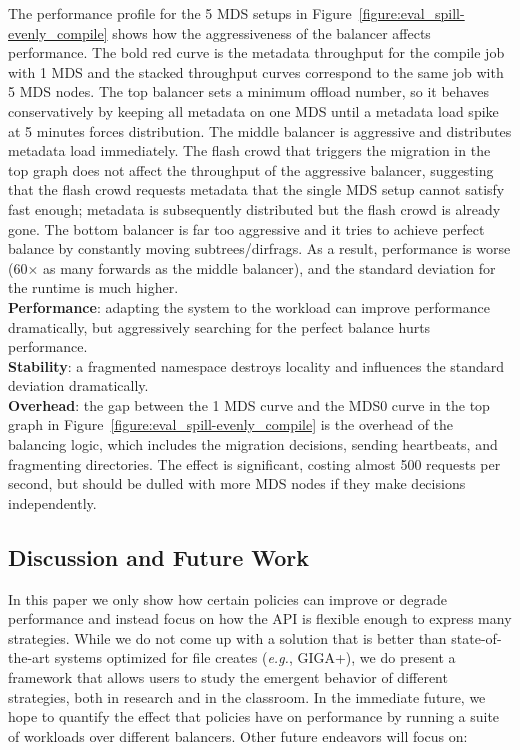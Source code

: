 The performance profile for the 5 MDS setups in Figure~\ref{figure:eval_spill-evenly_compile} shows how the aggressiveness of the balancer affects performance. The bold red curve is the metadata throughput for the compile job with 1 MDS and the stacked throughput curves correspond to the same job with 5 MDS nodes. The top balancer sets a minimum offload number, so it behaves conservatively by keeping all metadata on one MDS until a metadata load spike at 5 minutes forces distribution. The middle balancer is aggressive and distributes metadata load immediately. The flash crowd that triggers the migration in the top graph does not affect the throughput of the aggressive balancer, suggesting that the flash crowd requests metadata that the single MDS setup cannot satisfy fast enough; metadata is subsequently distributed but the flash crowd is already gone. The bottom balancer is far too aggressive and it  tries to achieve perfect balance by constantly moving subtrees/dirfrags. As a result, performance is worse (60\(\times\) as many forwards as the middle balancer), and the standard deviation for the runtime is much higher.\\

\noindent\textbf{Performance}: adapting the system to the workload can improve performance dramatically, but aggressively searching for the perfect balance hurts performance.\\
\noindent\textbf{Stability}: a fragmented namespace destroys locality and influences the standard deviation dramatically.\\
\noindent\textbf{Overhead}: the gap between the 1 MDS curve and the MDS0 curve in the top graph in Figure~\ref{figure:eval_spill-evenly_compile} is the overhead of the balancing logic, which includes the migration decisions, sending heartbeats, and fragmenting directories. The effect is significant, costing almost 500 requests per second, but should be dulled with more MDS nodes if they make decisions independently.

\subsection{Discussion and Future Work}
\label{discussion-future-work}
In this paper we only show how certain policies can improve or degrade performance and instead focus on how the API is flexible enough to express many strategies.  While we do not come up with a solution that is better than state-of-the-art systems optimized for file creates ({\it e.g.}, GIGA+), we do present a framework that allows users to study the emergent behavior of different strategies, both in research and in the classroom. In the immediate future, we hope to quantify the effect that policies have on performance by running a suite of workloads over different balancers. Other future endeavors will focus on:

